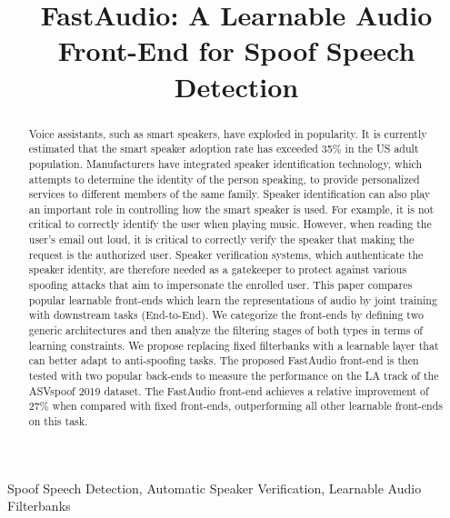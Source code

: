 \documentclass[conference]{IEEEtran}
\begin{document}
\title{FastAudio: A Learnable Audio Front-End for Spoof Speech Detection\\
}
\author{}


\maketitle

\begin{abstract}
Voice assistants, such as smart speakers, have exploded in popularity. It is currently estimated that the smart speaker adoption rate has exceeded 35\% in the US adult population. Manufacturers have integrated speaker identification technology, which attempts to determine the identity of the person speaking, to provide personalized services to different members of the same family. Speaker identification can also play an important role in controlling how the smart speaker is used. For example, it is not critical to correctly identify the user when playing music. However, when reading the user's email out loud, it is critical to correctly verify the speaker that making the request is the authorized user. Speaker verification systems, which authenticate the speaker identity, are therefore needed as a gatekeeper to protect against various spoofing attacks that aim to impersonate the enrolled user. This paper compares popular learnable front-ends which learn the representations of audio by joint training with downstream tasks (End-to-End). We categorize the front-ends by defining two generic architectures and then analyze the filtering stages of both types in terms of learning constraints. We propose replacing fixed filterbanks with a learnable layer that can better adapt to anti-spoofing tasks. The proposed FastAudio front-end is then tested with two popular back-ends to measure the performance on the LA track of the ASVspoof 2019 dataset. The FastAudio front-end achieves a relative improvement of 27\% when compared with fixed front-ends, outperforming all other learnable front-ends on this task.

\end{abstract}

\begin{IEEEkeywords}
Spoof Speech Detection, Automatic Speaker Verification, Learnable Audio Filterbanks
\end{IEEEkeywords}
\end{document}
